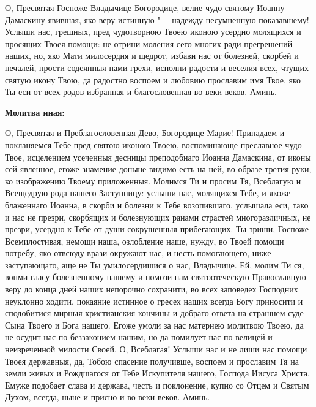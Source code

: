 О, Пресвятая Госпоже Владычице Богородице, велие чудо святому Иоанну Дамаскину явившая, яко веру истинную "--- надежду несумненную показавшему! Услыши нас, грешных, пред чудотворною Твоею иконою усердно молящихся и просящих Твоея помощи: не отрини моления сего многих ради прегрешений наших, но, яко Мати милосердия и щедрот, избави нас от болезней, скорбей и печалей, прости содеянныя нами грехи, исполни радости и веселия всех, чтущих святую икону Твою, да радостно воспоем и любовию прославим имя Твое, яко Ты еси от всех родов избранная и благословенная во веки веков. Аминь.


\medskip


\bfseries Молитва иная:\normalfont{}\nopagebreak


О, Пресвятая и Преблагословенная Дево, Богородице Марие! Припадаем и покланяемся Тебе пред святою иконою Твоею, воспоминающе преславное чудо Твое, исцелением усеченныя десницы преподобнаго Иоанна Дамаскина, от иконы сей явленное, егоже знамение доныне видимо есть на ней, во образе третия руки, ко изображению Твоему приложенныя. Молимся Ти и просим Тя, Всеблагую и Всещедрую рода нашего Заступницу: услыши нас, молящихся Тебе, и якоже блаженнаго Иоанна, в скорби и болезни к Тебе возопившаго, услышала еси, тако и нас не презри, скорбящих и болезнующих ранами страстей многоразличных, не презри, усердно к Тебе от души сокрушенныя прибегающих. Ты зриши, Госпоже Всемилостивая, немощи наша, озлобление наше, нужду, во Твоей помощи потребу, яко отвсюду врази окружают нас, и несть помогающего, ниже заступающаго, аще не Ты умилосердишися о нас, Владычице. Ей, молим Ти ся, вонми гласу болезненному нашему и помози нам святоотеческую Православную веру до конца дней наших непорочно сохранити, во всех заповедех Господних неуклонно ходити, покаяние истинное о гресех наших всегда Богу приносити и сподобитися мирныя христианския кончины и добраго ответа на страшнем суде Сына Твоего и Бога нашего. Егоже умоли за нас матернею молитвою Твоею, да не осудит нас по беззаконием нашим, но да помилует нас по велицей и неизреченной милости Своей. О, Всеблагая! Услыши нас и не лиши нас помощи Твоея державныя, да, Тобою спасение получивше, воспоем и прославим Тя на земли живых и Рождшагося от Тебе Искупителя нашего, Господа Иисуса Христа, Емуже подобает слава и держава, честь и поклонение, купно со Отцем и Святым Духом, всегда, ныне и присно и во веки веков. Аминь.
\nopagebreak\bigskip\bigskip\mychapterending

 
